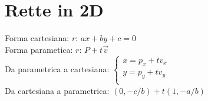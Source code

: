 \section{Rette in 2D}
Forma cartesiana: $r \text{: } ax+by+c=0$ \\
Forma parametica: $r \text{: } P+t\overrightarrow{v}$ \\

Da parametrica a cartesiana:
$\begin{cases}
	x = p_x + t v_x \\
	y = p_y + t v_y \\
\end{cases}$ \\

Da cartesiana a parametrica:  $(0, -c/b) + t (1, -a/b)$
